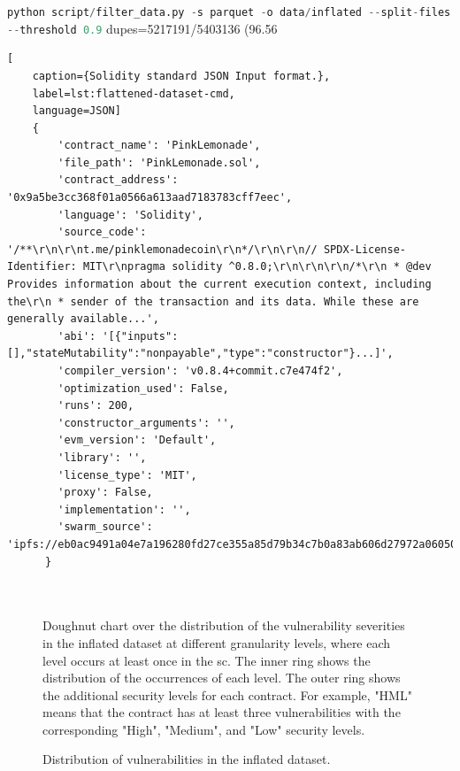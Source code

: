 

\lstinline[language=Python]!python script/filter_data.py -s parquet -o data/inflated --split-files --threshold 0.9!
dupes=5217191/5403136 (96.56%


\begin{lstlisting}[
    caption={Solidity standard JSON Input format.},
    label=lst:flattened-dataset-cmd,
    language=JSON]
    {
        'contract_name': 'PinkLemonade',
        'file_path': 'PinkLemonade.sol',
        'contract_address': '0x9a5be3cc368f01a0566a613aad7183783cff7eec',
        'language': 'Solidity',
        'source_code': '/**\r\n\r\nt.me/pinklemonadecoin\r\n*/\r\n\r\n// SPDX-License-Identifier: MIT\r\npragma solidity ^0.8.0;\r\n\r\n\r\n/*\r\n * @dev Provides information about the current execution context, including the\r\n * sender of the transaction and its data. While these are generally available...',
        'abi': '[{"inputs":[],"stateMutability":"nonpayable","type":"constructor"}...]',
        'compiler_version': 'v0.8.4+commit.c7e474f2',
        'optimization_used': False,
        'runs': 200,
        'constructor_arguments': '',
        'evm_version': 'Default',
        'library': '',
        'license_type': 'MIT',
        'proxy': False,
        'implementation': '',
        'swarm_source': 'ipfs://eb0ac9491a04e7a196280fd27ce355a85d79b34c7b0a83ab606d27972a06050c'
      }
      
      
\end{lstlisting}

\begin{figure}[htbp]
    \centering
    
    \caption{Doughnut chart over the distribution of the vulnerability severities in the inflated dataset at different granularity levels, where each level occurs at least once in the \acrshort{sc}. The inner ring shows the distribution of the occurrences of each level. The outer ring shows the additional security levels for each contract. For example, "HML" means that the contract has at least three vulnerabilities with the corresponding "High", "Medium", and "Low" security levels.}
\end{figure}


\begin{figure}[htbp]
    \centering
    
    \caption{Distribution of vulnerabilities in the inflated dataset.}
\end{figure}


